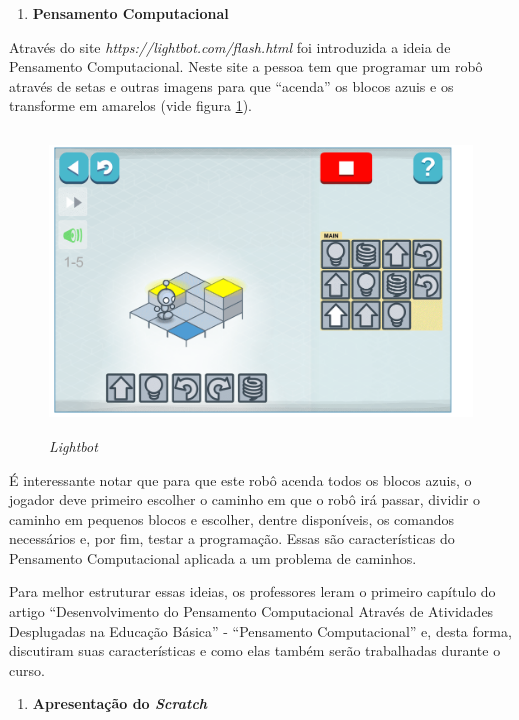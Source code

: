 \documentclass[12pt, openright, a4paper, brazil, english, french, spanish, bibjustif, openany, oneside]{abntex2}
\begin{document}
\begin{enumerate}[label=\textbf{\arabic*.}]

\item \textbf{Pensamento Computacional}

\end{enumerate}

Através do site \textit{https://lightbot.com/flash.html} foi introduzida a ideia de Pensamento Computacional. Neste site a pessoa tem que programar um robô através de setas e outras imagens para que ``acenda'' os blocos azuis e os transforme em amarelos (vide figura \ref{robo2}).

\begin{figure}[H]

    \center
    \caption{ \textit{Lightbot} \label{robo2}}
    \includegraphics[height=8cm]{robo2.png}
    
\end{figure}

É interessante notar que para que este robô acenda todos os blocos azuis, o jogador deve primeiro escolher o caminho em que o robô irá passar, dividir o caminho em pequenos blocos e escolher, dentre disponíveis, os comandos necessários e, por fim, testar a programação. Essas são características do Pensamento Computacional aplicada a um problema de caminhos.

Para melhor estruturar essas ideias, os professores leram o primeiro capítulo do artigo ``Desenvolvimento do Pensamento Computacional Através de Atividades Desplugadas na Educação Básica'' - ``Pensamento Computacional'' \cite{brac} e, desta forma, discutiram suas características e como elas também serão trabalhadas durante o curso.

\begin{enumerate}[resume, label=\textbf{\arabic*.}]

\item \textbf{Apresentação do \textit{Scratch}}

\end{enumerate}
\end{document}

